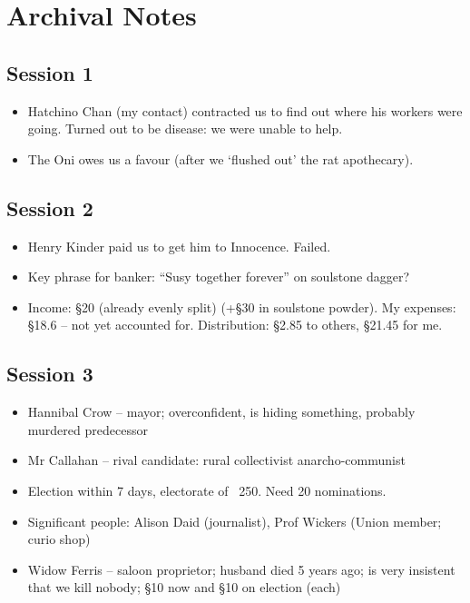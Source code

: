 \documentclass[10pt,a4paper]{article}
\begin{document}
\begin{minipage}[t]{\textwidth}

\section*{Archival Notes}

\subsection*{Session 1}

	\begin{itemize}
	  \item Hatchino Chan (my contact) contracted us to find out where his workers were going. Turned out to be disease: we were unable to help.
	  \item The Oni owes us a favour (after we `flushed out' the rat apothecary).
	\end{itemize}
	
\subsection*{Session 2} 

  \begin{itemize}
    \item Henry Kinder paid us to get him to Innocence. Failed.
    \item Key phrase for banker: ``Susy together forever'' on soulstone dagger?
    \item Income: §20 (already evenly split) (+§30 in soulstone powder). My expenses: §18.6 -- not yet accounted for. Distribution: §2.85 to others, §21.45 for me.
  \end{itemize}
  
\subsection*{Session 3}

  \begin{itemize}
    \item Hannibal Crow -- mayor; overconfident, is hiding something, probably murdered predecessor
    \item Mr Callahan -- rival candidate: rural collectivist anarcho-communist
    \item Election within 7 days, electorate of ~250. Need 20 nominations.
    \item Significant people: Alison Daid (journalist), Prof Wickers (Union member; curio shop)
    \item Widow Ferris -- saloon proprietor; husband died 5 years ago; is very insistent that we kill nobody; §10 now and §10 on election (each)
  \end{itemize}
  

\end{minipage}
\end{document}
